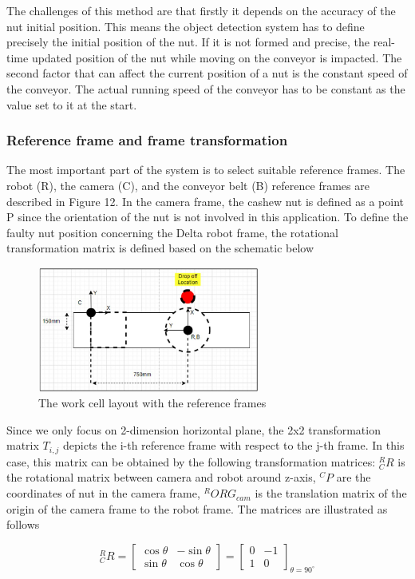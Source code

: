 \documentclass[10pt, letterpaper]{article}
\begin{document}
    The challenges of this method are that firstly it depends on the accuracy of the nut initial position. This means the object detection system has to define precisely the initial position of the nut. If it is not formed and precise, the real-time updated position of the nut while moving on the conveyor is impacted. The second factor that can affect the current position of a nut is the constant speed of the conveyor. The actual running speed of the conveyor has to be constant as the value set to it at the start.\par

\subsubsection*{Reference frame and frame transformation}
    The most important part of the system is to select suitable reference frames. The robot (R), the camera (C), and the conveyor belt (B) reference frames are described in Figure 12. In the camera frame, the cashew nut is defined as a point P since the orientation of the nut is not involved in this application. To define the faulty nut position concerning the Delta robot frame, the rotational transformation matrix is defined based on the schematic below\par
    \begin{figure}[h]
        \centering
        \includegraphics[width=0.65\textwidth]{fig12.JPG}
        \caption{The work cell layout with the reference frames}
    \end{figure}
    Since we only focus on 2-dimension horizontal plane, the 2x2 transformation matrix \(T_{i,j}\) depicts the i-th reference frame with respect to the j-th frame. In this case, this matrix can be obtained by the following transformation matrices: ${}^{R}_{C}R$ is the rotational matrix between camera and robot around z-axis, ${}^{C}P$ are the coordinates of nut in the camera frame, ${}^{R}ORG_{cam}$  is the translation matrix of the origin of the camera frame to the robot frame. The matrices are illustrated as follows\par
    \begin{equation} \label{eq12} 
        {}^{R}_{C}R = 
        \begin{bmatrix}
            \cos{\theta} & -\sin{\theta}\\
            \sin{\theta} & \cos{\theta}
        \end{bmatrix}
        =
        \begin{bmatrix}
            0 & -1\\
            1 & 0
        \end{bmatrix}_{\theta = 90^{\circ}}
    \end{equation}
\end{document}
